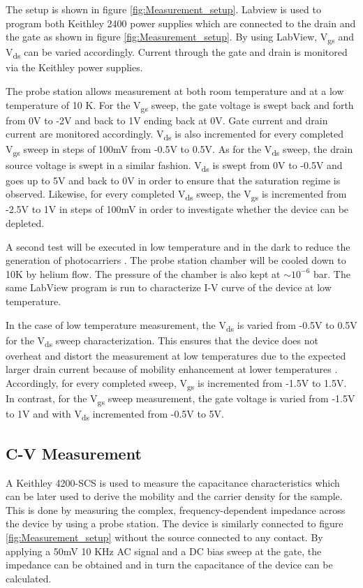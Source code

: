 \documentclass[11pt,a4paper]{report}
\begin{document}
The setup is shown in figure \ref{fig:Measurement_setup}. Labview is used to program both Keithley 2400 power supplies which are connected to the drain and the gate as shown in figure \ref{fig:Measurement_setup}. By using LabView, V\textsubscript{gs} and V\textsubscript{ds} can be varied accordingly. Current through the gate and drain is monitored via the Keithley power supplies.

The probe station allows measurement at both room temperature and at a low temperature of 10 K. For the V\textsubscript{gs} sweep, the gate voltage is swept back and forth from 0V to -2V and back to 1V ending back at 0V. Gate current and drain current are monitored accordingly. V\textsubscript{ds} is also incremented for every completed V\textsubscript{gs} sweep in steps of 100mV from -0.5V to 0.5V. As for the V\textsubscript{ds} sweep, the drain source voltage is swept in a similar fashion. V\textsubscript{ds} is swept from 0V to -0.5V and goes up to 5V and back to 0V in order to ensure that the saturation regime is observed. Likewise, for every completed V\textsubscript{ds} sweep, the V\textsubscript{gs} is incremented from -2.5V to 1V in steps of 100mV in order to investigate whether the device can be depleted.

A second test will be executed in low temperature and in the dark to reduce the generation of photocarriers \cite{hook_hall_2013}. The probe station chamber will be cooled down to 10K by helium flow. The pressure of the chamber is also kept at $\sim 10^{-6}$ bar. The same LabView program is run to characterize I-V curve of the device at low temperature.

In the case of low temperature measurement, the V\textsubscript{ds} is varied from -0.5V to 0.5V for the V\textsubscript{ds} sweep characterization. This ensures that the device does not overheat and distort the measurement at low temperatures due to the expected larger drain current because of mobility enhancement at lower temperatures \cite{caviglia}. Accordingly, for every completed sweep, V\textsubscript{gs} is incremented from -1.5V to 1.5V. In contrast, for the V\textsubscript{gs} sweep measurement, the gate voltage is varied from -1.5V to 1V and with V\textsubscript{ds} incremented from -0.5V to 5V. 

\subsection{C-V Measurement}\label{Sec:CV}
A Keithley 4200-SCS is used to measure the capacitance characteristics which can be later used to derive the mobility and the carrier density for the sample. This is done by measuring the complex, frequency-dependent impedance across the device by using a probe station. The device is similarly connected to figure \ref{fig:Measurement_setup} without the source connected to any contact. By applying a 50mV 10 KHz AC signal and a DC bias sweep at the gate, the impedance can be obtained and in turn the capacitance of the device can be calculated.
\end{document}

